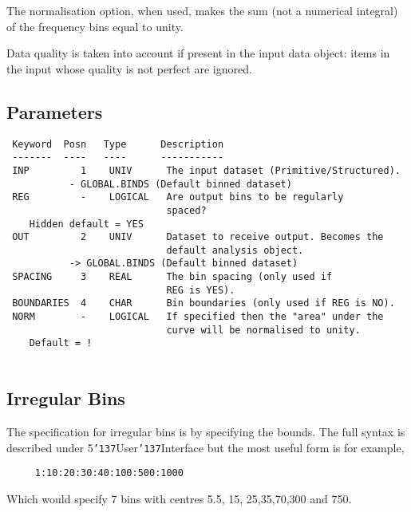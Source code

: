 \documentclass{book}
\renewcommand{\_}{{\tt\char'137}}     %
\begin{document}
The normalisation option, when used, makes the sum (not a
numerical integral) of the frequency bins equal to unity.
 
Data quality is taken into account if present in the input data
object: items in the input whose quality is not perfect are
ignored.
 
\subsection{Parameters}
\begin{verbatim}
 Keyword  Posn   Type      Description
 -------  ----   ----      -----------
 INP         1    UNIV      The input dataset (Primitive/Structured).
           - GLOBAL.BINDS (Default binned dataset)
 REG         -    LOGICAL   Are output bins to be regularly
                            spaced?
    Hidden default = YES
 OUT         2    UNIV      Dataset to receive output. Becomes the
                            default analysis object.
           -> GLOBAL.BINDS (Default binned dataset)
 SPACING     3    REAL      The bin spacing (only used if
                            REG is YES).
 BOUNDARIES  4    CHAR      Bin boundaries (only used if REG is NO).
 NORM        -    LOGICAL   If specified then the "area" under the
                            curve will be normalised to unity.
    Default = !
 
\end{verbatim}\subsection{Irregular Bins}
The specification for irregular bins is by specifying the
bounds. The full syntax is described under 5\_User\_Interface
but the most useful form is for example,
\begin{verbatim}
     1:10:20:30:40:100:500:1000
\end{verbatim}
Which would specify 7 bins with centres 5.5, 15, 25,35,70,300 and 750.
 
\end{document}
